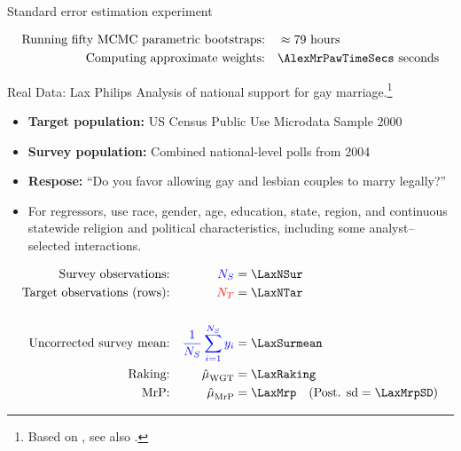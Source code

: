 

\begin{frame}[t]{Standard error estimation experiment}

\wholeslidefig{\BootstrapPlot{}}

\pause
$$
\begin{aligned}
    \textrm{Running fifty MCMC parametric bootstraps:}\quad & \approx 79 \textrm{ hours} \\
    \textrm{Computing approximate weights:}\quad &\AlexMrPawTimeSecs \textrm{ seconds}\\
\end{aligned}
$$
\end{frame}





\begin{frame}{Real Data: Lax Philips}
Analysis of national support for gay marriage.\footnote{Based on \textcite{kastellec:2010:laxmrp},
see also \textcite{lax:2009:gay}.}

\begin{itemize}
    \item \textbf{Target population:} US Census Public Use Microdata Sample 2000
    \item \textbf{Survey population:} Combined national-level polls from 2004
    \item \textbf{Respose:}  ``Do you favor allowing gay and lesbian couples to marry legally?''
    \item For regressors, use race, gender, age, education, state, region,
        and continuous statewide religion and political characteristics, including
        some analyst--selected interactions.
\end{itemize}

$$
\begin{aligned}
    \textrm{Survey observations:} &&  \surcol{\Nsur} ={}& \LaxNSur  \\
    \textrm{Target observations (rows):} &&  \tarcol{\Ntar} ={}& \LaxNTar \\
    \\
    \textrm{Uncorrected survey mean:} && \surcol{\meansur \y_i} ={}& \LaxSurmean \\
    \textrm{Raking:} && \muhat_\cal ={}& \LaxRaking \\
    \textrm{MrP:} && \muhat_\mrp ={}& \LaxMrp
        \quad(\textrm{Post. sd} = \LaxMrpSD)\\
\end{aligned}
$$
%
\end{frame}



